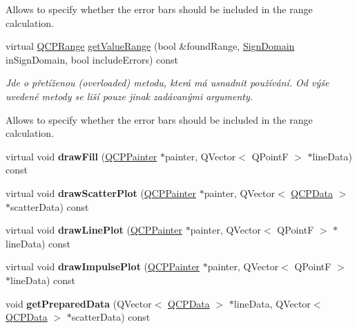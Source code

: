 \begin{DoxyCompactItemize}
\begin{DoxyCompactList}
Allows to specify whether the error bars should be included in the range calculation. \end{DoxyCompactList}\item 
virtual \hyperlink{classQCPRange}{Q\+C\+P\+Range} \hyperlink{classQCPGraph_ab964a21d680af93435d68126d8c5ab29}{get\+Value\+Range} (bool \&found\+Range, \hyperlink{classQCPAbstractPlottable_a661743478a1d3c09d28ec2711d7653d8}{Sign\+Domain} in\+Sign\+Domain, bool include\+Errors) const 
\begin{DoxyCompactList}\small\item\em Jde o přetíženou (overloaded) metodu, která má usnadnit používání. Od výše uvedené metody se liší pouze jinak zadávanými argumenty.

Allows to specify whether the error bars should be included in the range calculation. \end{DoxyCompactList}\item 
\hypertarget{classQCPGraph_ad6d07926e6d6b7cfa70258780d47b7a0}{}virtual void {\bfseries draw\+Fill} (\hyperlink{classQCPPainter}{Q\+C\+P\+Painter} $\ast$painter, Q\+Vector$<$ Q\+Point\+F $>$ $\ast$line\+Data) const \label{classQCPGraph_ad6d07926e6d6b7cfa70258780d47b7a0}

\item 
\hypertarget{classQCPGraph_a6bdc385b122ce06134d4196373ae2250}{}virtual void {\bfseries draw\+Scatter\+Plot} (\hyperlink{classQCPPainter}{Q\+C\+P\+Painter} $\ast$painter, Q\+Vector$<$ \hyperlink{classQCPData}{Q\+C\+P\+Data} $>$ $\ast$scatter\+Data) const \label{classQCPGraph_a6bdc385b122ce06134d4196373ae2250}

\item 
\hypertarget{classQCPGraph_acebc22c3385829b19a87e6281fe6ade2}{}virtual void {\bfseries draw\+Line\+Plot} (\hyperlink{classQCPPainter}{Q\+C\+P\+Painter} $\ast$painter, Q\+Vector$<$ Q\+Point\+F $>$ $\ast$line\+Data) const \label{classQCPGraph_acebc22c3385829b19a87e6281fe6ade2}

\item 
\hypertarget{classQCPGraph_abc01180629621f1e47e94559227d3d8c}{}virtual void {\bfseries draw\+Impulse\+Plot} (\hyperlink{classQCPPainter}{Q\+C\+P\+Painter} $\ast$painter, Q\+Vector$<$ Q\+Point\+F $>$ $\ast$line\+Data) const \label{classQCPGraph_abc01180629621f1e47e94559227d3d8c}

\item 
\hypertarget{classQCPGraph_ab420b46ba638dc3252439fe16687b244}{}void {\bfseries get\+Prepared\+Data} (Q\+Vector$<$ \hyperlink{classQCPData}{Q\+C\+P\+Data} $>$ $\ast$line\+Data, Q\+Vector$<$ \hyperlink{classQCPData}{Q\+C\+P\+Data} $>$ $\ast$scatter\+Data) const \label{classQCPGraph_ab420b46ba638dc3252439fe16687b244}


\end{DoxyCompactItemize}
